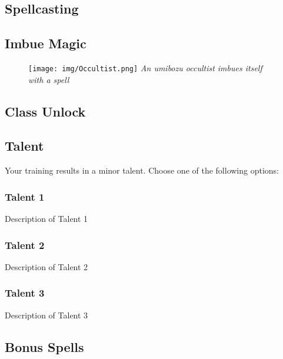 \vspace{.1 in}

\subsection*{Spellcasting}
\lipsum[1]

\vspace{.1 in}

\subsection*{Imbue Magic}
\lipsum[1]

\vspace{.1 in}

\begin{figure}[ht!]
	\centering
	\texttt{[image: img/Occultist.png]}
	\textit{An umibozu occultist imbues itself with a spell}
\end{figure}


\subsection*{Class Unlock}
\lipsum[1]

\vspace{.1 in}

\subsection*{Talent}
Your training results in a minor talent. Choose one of the following options:

\subsubsection{Talent 1}
Description of Talent 1

\subsubsection{Talent 2}
Description of Talent 2

\subsubsection{Talent 3}
Description of Talent 3

\vspace{.1 in}

\subsection*{Bonus Spells}
\lipsum[1]

